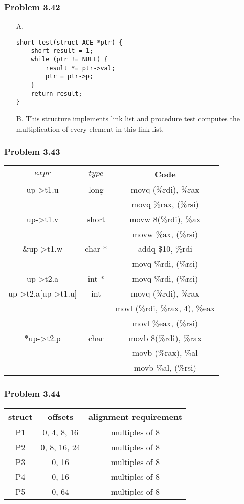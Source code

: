\documentclass[a4paper]{article}
\begin{document}
\subsubsection*{Problem 3.42}
\begin{enumerate}
    \item [A.]
    \begin{lstlisting}
short test(struct ACE *ptr) {
    short result = 1;
    while (ptr != NULL) {
        result *= ptr->val;
        ptr = ptr->p;
    }
    return result;
}
    \end{lstlisting}
    \item [B.] This structure implements link list and procedure test computes the multiplication of every element in this link list.
\end{enumerate}

\subsubsection*{Problem 3.43}
\begin{tabular}{ccc}
    $expr$&$type$&Code\\\hline
    up->t1.u&long&movq (\%rdi), \%rax\\
    && movq \%rax, (\%rsi)\\
    up->t1.v&short&movw 8(\%rdi), \%ax\\
    && movw \%ax, (\%rsi)\\
    \&up->t1.w&char *&addq \$10, \%rdi\\
    &&movq \%rdi, (\%rsi)\\
    up->t2.a&int *&movq \%rdi, (\%rsi)\\
    up->t2.a[up->t1.u]&int&movq (\%rdi), \%rax\\
    &&movl (\%rdi, \%rax, 4), \%eax\\
    &&movl \%eax, (\%rsi)\\
    $\ast$up->t2.p&char&movb 8(\%rdi), \%rax\\
    &&movb (\%rax), \%al\\
    &&movb \%al, (\%rsi)
    
\end{tabular}

\subsubsection*{Problem 3.44}
\begin{tabular}{ccc}
    struct&offsets&alignment requirement\\\hline
    P1&0, 4, 8, 16&multiples of 8\\
    P2&0, 8, 16, 24&multiples of 8\\
    P3&0, 16&multiples of 8\\
    P4&0, 16&multiples of 8\\
    P5&0, 64&multiples of 8
\end{tabular}
\end{document}
